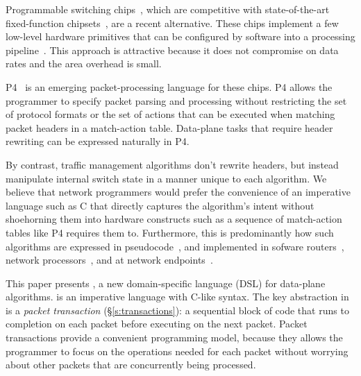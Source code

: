Programmable switching chips~\cite{flexpipe, xpliant, rmt}, which are
competitive with state-of-the-art fixed-function
chipsets~\cite{trident, tomahawk, mellanox}, are a recent alternative.
These chips implement a few low-level hardware primitives that can be
configured by software into a processing
pipeline~\cite{xpliant_sdk,xpliant_sdk2,intel_sdk,rmt,p4}. This
approach is attractive because it does not compromise on data rates
and the area overhead is small.


P4~\cite{p4, p4spec} is an emerging packet-processing language for
these chips. P4 allows the programmer to specify packet parsing and
processing without restricting the set of protocol formats or the set
of actions that can be executed when matching packet headers in a
match-action table. Data-plane tasks that require header rewriting can
be expressed naturally in P4.

By contrast, traffic management algorithms don't rewrite headers, but
instead manipulate internal switch state in a manner unique to each
algorithm. We believe that network programmers would prefer the
convenience of an imperative language such as C that directly captures
the algorithm's intent without shoehorning them into hardware
constructs such as a sequence of match-action tables like P4 requires
them to.  Furthermore, this is predominantly how such algorithms are
expressed in pseudocode~\cite{red, csfq, codel_code, avq, blue}, and
implemented in sofware routers~\cite{click, dpdk, routebricks},
network processors~\cite{packetc, nova}, and at network
endpoints~\cite{qdisc}.

This paper presents \pktlanguage, a new domain-specific language (DSL)
for data-plane algorithms.  \pktlanguage is an imperative language
with C-like syntax. The key abstraction in \pktlanguage is a {\em
  packet transaction} (\S\ref{s:transactions}): a sequential block of
code that runs to completion on each packet before executing on the
next packet. Packet transactions provide a convenient programming
model, because they allows the programmer to focus on the operations
needed for each packet without worrying about other packets that are
concurrently being processed.

